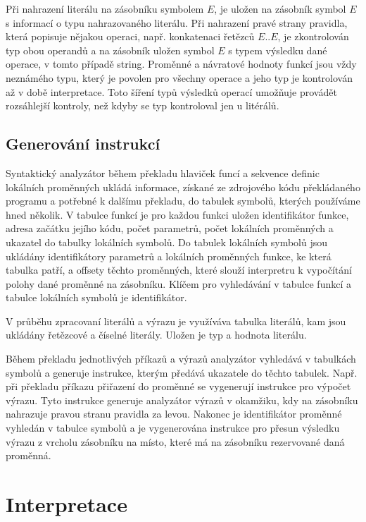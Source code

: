 \documentclass[a4paper,11pt,titlepage]{article}
\begin{document}
Při nahrazení literálu na zásobníku symbolem $E$, je uložen na zásobník symbol $E$ s informací o typu nahrazovaného literálu.
Při nahrazení pravé strany pravidla, která popisuje nějakou operaci, např. konkatenaci řetězců $E .. E$, je zkontrolován typ obou operandů a na zásobník uložen symbol $E$ s typem výsledku dané operace, v tomto případě string. Proměnné a návratové hodnoty funkcí jsou vždy neznámého typu, který je povolen pro všechny operace a jeho typ je kontrolován až v době interpretace. Toto šíření typů výsledků operací umožňuje provádět rozsáhlejší kontroly, než kdyby se typ kontroloval jen u litérálů.

\subsection{Generování instrukcí}

Syntaktický analyzátor během překladu hlaviček funcí a sekvence definic lo\-kál\-ních proměnných ukládá informace, získané ze zdrojového kódu pře\-klá\-da\-ného programu a potřebné k dalšímu překladu, do tabulek symbolů, kterých používáme hned několik. V tabulce funkcí je pro každou funkci uložen identifikátor funkce, adresa začátku jejího kódu, počet parametrů, počet lokálních pro\-měn\-ných a ukazatel do tabulky lokálních symbolů. Do tabulek lokálních symbolů jsou ukládány identifikátory parametrů a lokálních proměnných funkce, ke která tabulka patří, a offsety těchto proměnných, které slouží interpretru k vypočítání polohy dané proměnné na zásobníku. Klíčem pro vyhledávání v tabulce funkcí a tabulce lokálních symbolů je identifikátor.

V průběhu zpracovaní literálů a výrazu je využíváva tabulka literálů, kam jsou ukládány řetězcové a číselné  literály. Uložen je typ a hodnota literálu.

Během překladu jednotlivých příkazů a výrazů analyzátor vyhledává v tabulkách symbolů a generuje instrukce, kterým předává ukazatele do těchto tabulek. Např. při překladu příkazu přiřazení do proměnné se vygenerují instrukce pro výpočet výrazu. Tyto instrukce generuje analyzátor výrazů v okamžiku, kdy na zásobníku nahrazuje pravou stranu pravidla za levou. Nakonec je identifikátor proměnné vyhledán v tabulce symbolů a je vygenerována instrukce pro přesun výsledku výrazu z vrcholu zásobníku na místo, které má na zásobníku rezervované daná proměnná.

\section{Interpretace}
\end{document}
